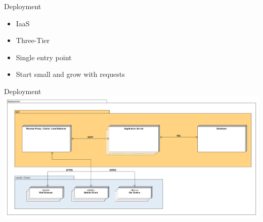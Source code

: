 \documentclass{beamer}
\begin{document}
\begin{frame}{Deployment}
    \begin{itemize}
        \item IaaS
        \item Three-Tier
        \item Single entry point
        \item Start small and grow with requests
    \end{itemize}
\end{frame}

\begin{frame}{Deployment}
    \includegraphics[width=\textwidth]{deployment}
\end{frame}
\end{document}
